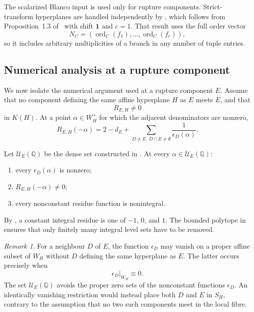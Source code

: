 \documentclass[12pt]{amsart}
\numberwithin{equation}{section}
\theoremstyle{plain}
\theoremstyle{definition}
\theoremstyle{remark}
\newtheorem{remark}[theorem]{Remark}
\theoremstyle{definition}
\DeclareMathOperator{\ord}{ord}
\newcommand{\Q}{\mathbb Q}
\newcommand{\one}{\mathbf 1}
\begin{document}
The scalarized Blanco input is used only for rupture components. Strict-transform hyperplanes are handled independently by , which follows from Proposition~1.3 of~\cite{BvdVVW2024} with shift $\one$ and $c=1$. That
result uses the full order vector
\begin{equation*}
N_C=(\ord_C(f_1),\ldots,\ord_C(f_r)),
\end{equation*}
so it includes arbitrary multiplicities of a branch in any number of tuple entries.

\subsection{Numerical analysis at a rupture component}

We now isolate the numerical argument used at a rupture component $E$. Assume that no component defining the same affine hyperplane $H$ as $E$ meets $E$, and that
\begin{equation*}
R_{E,H}\neq0
\end{equation*}
in $K(H)$. At a point $\alpha\in W_H^+$ for which the adjacent denominators are nonzero,
\begin{equation}\label{eq:selected-component-residue}
 R_{E,H}(-\alpha)
 =
 2-d_E+\sum_{D\neq E,\, D\cap E\neq \emptyset}\frac1{\epsilon_D(\alpha)}.
\end{equation}


Let $\mathcal U_E(\Q)$ be the dense set constructed in . At every $\alpha\in\mathcal U_E(\Q)$:
\begin{enumerate}[label=\textup{(\roman*)}]
 \item every $\epsilon_D(\alpha)$ is nonzero;
 \item $R_{E,H}(-\alpha)\neq0$;
 \item every nonconstant residue function is nonintegral.
\end{enumerate}
By , a constant integral residue is one of $-1$, $0$, and $1$. The bounded polytope in  ensures that only finitely many integral level sets have to be removed.

\begin{remark}\label{rem:pointwise-zero}
For a neighbour $D$ of $E$, the function $\epsilon_D$ may vanish on a proper affine subset of $W_H$ without $D$ defining the same hyperplane as $E$. The latter occurs precisely when
\begin{equation*}
\epsilon_D|_{W_H}\equiv0.
\end{equation*}
The set $\mathcal U_E(\Q)$ avoids the proper zero sets of the nonconstant functions $\epsilon_D$. An identically vanishing restriction would instead place both $D$ and $E$ in $S_H$, contrary to the assumption that no two such components meet in the local fibre.
\end{remark}
\end{document}
